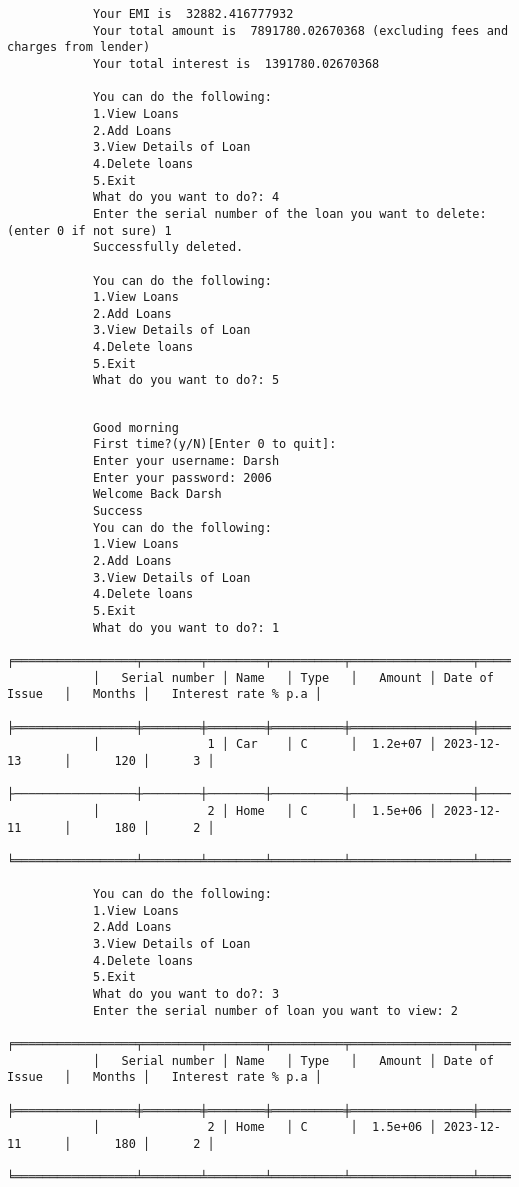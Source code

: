 \documentclass[12pt,a4paper]{article}
\begin{document}
\begin{normalsize}
\begin{verbatim}
			Your EMI is  32882.416777932
			Your total amount is  7891780.02670368 (excluding fees and charges from lender)
			Your total interest is  1391780.02670368 
			
			You can do the following:
			1.View Loans
			2.Add Loans
			3.View Details of Loan
			4.Delete loans
			5.Exit
			What do you want to do?: 4
			Enter the serial number of the loan you want to delete:(enter 0 if not sure) 1
			Successfully deleted.
			
			You can do the following:
			1.View Loans
			2.Add Loans
			3.View Details of Loan
			4.Delete loans
			5.Exit
			What do you want to do?: 5
			
		\end{verbatim}
	\end{normalsize}
	
	\newpage
	\begin{normalsize}
		{}
		\vspace{1.5cm}
		\begin{verbatim}
			Good morning
			First time?(y/N)[Enter 0 to quit]:
			Enter your username: Darsh
			Enter your password: 2006
			Welcome Back Darsh
			Success
			You can do the following:
			1.View Loans
			2.Add Loans
			3.View Details of Loan
			4.Delete loans
			5.Exit
			What do you want to do?: 1
			╒═════════════════╤════════╤════════╤══════════╤═════════════════╤══════════╤═══════════════════════╕
			│   Serial number │ Name   │ Type   │   Amount │ Date of Issue   │   Months │   Interest rate % p.a │
			╞═════════════════╪════════╪════════╪══════════╪═════════════════╪══════════╪═══════════════════════╡
			│               1 │ Car    │ C      │  1.2e+07 │ 2023-12-13      │      120 │      3 │
			├─────────────────┼────────┼────────┼──────────┼─────────────────┼──────────┼───────────────────────┤
			│               2 │ Home   │ C      │  1.5e+06 │ 2023-12-11      │      180 │      2 │
			╘═════════════════╧════════╧════════╧══════════╧═════════════════╧══════════╧═══════════════════════╛
			
			You can do the following:
			1.View Loans
			2.Add Loans
			3.View Details of Loan
			4.Delete loans
			5.Exit
			What do you want to do?: 3
			Enter the serial number of loan you want to view: 2
			╒═════════════════╤════════╤════════╤══════════╤═════════════════╤══════════╤═══════════════════════╕
			│   Serial number │ Name   │ Type   │   Amount │ Date of Issue   │   Months │   Interest rate % p.a │
			╞═════════════════╪════════╪════════╪══════════╪═════════════════╪══════════╪═══════════════════════╡
			│               2 │ Home   │ C      │  1.5e+06 │ 2023-12-11      │      180 │      2 │
			╘═════════════════╧════════╧════════╧══════════╧═════════════════╧══════════╧═══════════════════════╛
			

\end{verbatim}
\end{normalsize}
\end{document}
